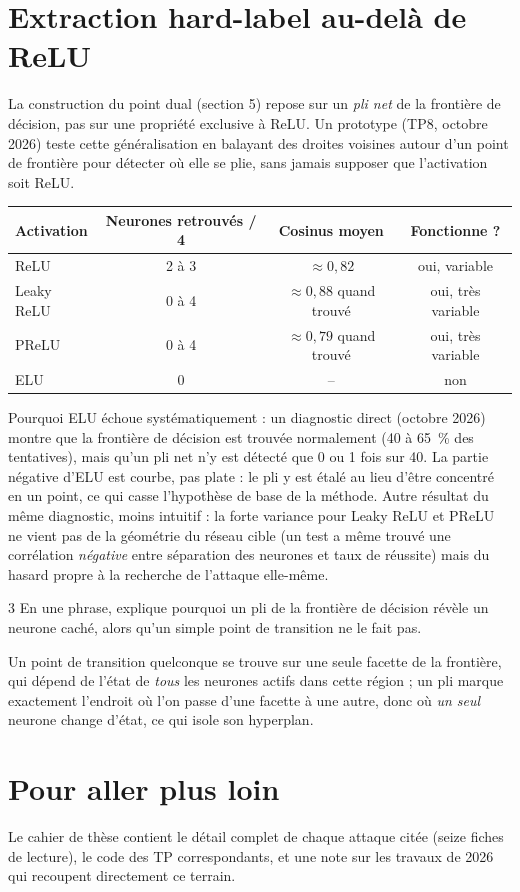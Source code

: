 \documentclass[11pt]{article}
\begin{document}
\section{Extraction hard-label au-delà de ReLU}

La construction du point dual (section 5) repose sur un \emph{pli net} de la frontière de décision, pas sur une propriété exclusive à ReLU. Un prototype (TP8, octobre 2026) teste cette généralisation en balayant des droites voisines autour d'un point de frontière pour détecter où elle se plie, sans jamais supposer que l'activation soit ReLU.

\begin{table}[h]
\centering
\begin{tabular}{lccc}
\toprule
Activation & Neurones retrouvés / 4 & Cosinus moyen & Fonctionne ? \\
\midrule
ReLU & 2 à 3 & $\approx0{,}82$ & oui, variable \\
Leaky ReLU & 0 à 4 & $\approx0{,}88$ quand trouvé & oui, très variable \\
PReLU & 0 à 4 & $\approx0{,}79$ quand trouvé & oui, très variable \\
ELU & 0 & -- & non \\
\bottomrule
\end{tabular}
\end{table}

\begin{remarque}
Pourquoi ELU échoue systématiquement : un diagnostic direct (octobre 2026) montre que la frontière de décision est trouvée normalement (40 à 65~\% des tentatives), mais qu'un pli net n'y est détecté que 0 ou 1 fois sur 40. La partie négative d'ELU est courbe, pas plate : le pli y est étalé au lieu d'être concentré en un point, ce qui casse l'hypothèse de base de la méthode. Autre résultat du même diagnostic, moins intuitif : la forte variance pour Leaky ReLU et PReLU ne vient pas de la géométrie du réseau cible (un test a même trouvé une corrélation \emph{négative} entre séparation des neurones et taux de réussite) mais du hasard propre à la recherche de l'attaque elle-même.
\end{remarque}

\begin{exo}{3}
En une phrase, explique pourquoi un pli de la frontière de décision révèle un neurone caché, alors qu'un simple point de transition ne le fait pas.
\end{exo}
\begin{sol}
Un point de transition quelconque se trouve sur une seule facette de la frontière, qui dépend de l'état de \emph{tous} les neurones actifs dans cette région ; un pli marque exactement l'endroit où l'on passe d'une facette à une autre, donc où \emph{un seul} neurone change d'état, ce qui isole son hyperplan.
\end{sol}

\section{Pour aller plus loin}

Le cahier de thèse contient le détail complet de chaque attaque citée (seize fiches de lecture), le code des TP correspondants, et une note sur les travaux de 2026 qui recoupent directement ce terrain.
\end{document}
